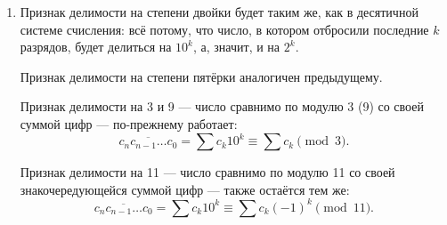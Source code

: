\begin{enumerate}
\item Признак делимости на степени двойки будет таким же, как в десятичной системе счисления: всё потому, что число, в котором отбросили последние $k$ разрядов, будет делиться на $10^k$, а, значит, и на $2^k$.

Признак делимости на степени пятёрки аналогичен предыдущему.

Признак делимости на 3 и 9 — число сравнимо по модулю 3 (9) со своей суммой цифр — по-прежнему работает:
$$\overline{c_nc_{n-1}\ldots c_0} = \sum c_k10^k \equiv \sum c_k \pmod 3.$$

Признак делимости на 11 — число сравнимо по модулю 11 со своей знакочередующейся суммой цифр — также остаётся тем же:
$$\overline{c_nc_{n-1}\ldots c_0} = \sum c_k10^k \equiv \sum c_k(-1)^k \pmod{11}.$$

\end{enumerate}
